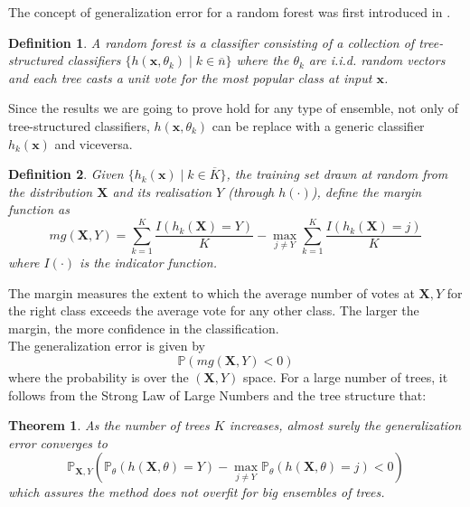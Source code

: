 \documentclass[a4paper,12pt]{article}
\newtheorem{definition}{Definition}[section]
\newtheorem{theorem}{Theorem}[section]
\begin{document}
The concept of generalization error for a random forest was first introduced in \cite{breiman2001random}.

\begin{definition}
A random forest is a classifier consisting of a collection of tree-structured classifiers $\{h( \textbf{x},  \theta_{k} ) \mid k \in  \overline{n} \}$ where the $\theta_{k}$ are i.i.d. random vectors and each tree casts a unit vote for the most popular class at input $\textbf{x}$.
\end{definition}

Since the results we are going to prove hold for any type of ensemble, not only of tree-structured classifiers, $h( \textbf{x},  \theta_{k} )$ can be replace with a generic classifier $h _{k}( \textbf{x} )$ and viceversa.
\begin{definition}
Given $\{h_{k} ( \textbf{x}) \mid k \in  \overline{K} \}$, the training set drawn
at random from the distribution $\textbf{X}$ and its realisation $Y$ (through $h(\cdot)$), define the margin function as $$mg(\textbf{X},Y)= \sum_{k=1}^{K} \frac{I(h_{k}(\textbf{X})=Y) }{K} - \max_{j \neq Y}  \sum_{k=1}^{K}\frac{I(h_{k}(\textbf{X})=j) }{K} $$
where $I (\cdot)$ is the indicator function. 
\end{definition}
The margin measures the extent to which the average number of votes at $\textbf{X}, Y$ for the right class exceeds the average vote for any other class. The larger the margin, the more confidence in the classification. \\
The generalization error is given by
$$\mathbb{P}(mg(\textbf{X}, Y)<0)$$
where the probability is over the $(\textbf{X}, Y)$ space.
For a large number of trees, it follows from the
Strong Law of Large Numbers and the tree structure that:
\begin{theorem}
As the number of trees $K$ increases, almost surely the generalization error
converges to
$$\mathbb{P}_{\textbf{X}, Y}(\mathbb{P}_{\theta}(h(\textbf{X}, \theta) = Y)- \max_{j \neq Y} \mathbb{P}_{\theta}(h(\textbf{X}, \theta) = j) < 0)$$
which assures the method does not overfit for big ensembles of trees.
\end{theorem}
\end{document}
